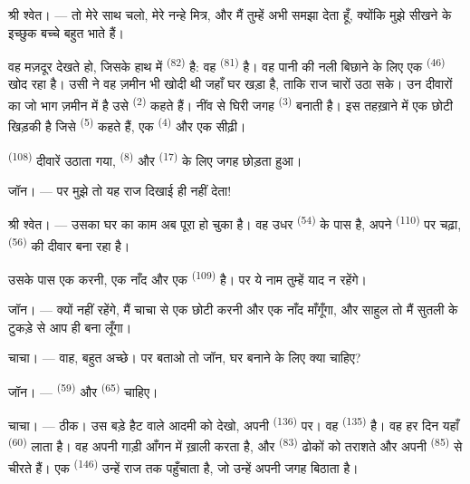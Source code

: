 \VUsaut{3.0mm}

\textsc{श्री श्वेत}। --- तो मेरे साथ चलो, मेरे नन्हे मित्र, और मैं तुम्हें अभी
समझा देता हूँ, क्योंकि मुझे सीखने के इच्छुक बच्चे बहुत भाते हैं।

वह मज़दूर देखते हो, जिसके हाथ में  \textsuperscript{(82)} है: वह
 \textsuperscript{(81)} है। वह पानी की नली बिछाने के लिए
एक  \textsuperscript{(46)} खोद रहा है। उसी ने वह ज़मीन भी खोदी थी
जहाँ घर खड़ा है, ताकि राज चारों  उठा सके। उन दीवारों का जो भाग
ज़मीन में है उसे  \textsuperscript{(2)} कहते हैं। नींव से घिरी जगह
 \textsuperscript{(3)} बनाती है। इस तहख़ाने में एक छोटी खिड़की है
जिसे  \textsuperscript{(5)} कहते हैं, एक 
\textsuperscript{(4)} और एक सीढ़ी।

 \textsuperscript{(108)} दीवारें उठाता गया, 
\textsuperscript{(8)} और  \textsuperscript{(17)} के लिए जगह
छोड़ता हुआ।

\textsc{जॉन}। --- पर मुझे तो यह राज दिखाई ही नहीं देता!

\textsc{श्री श्वेत}। --- उसका घर का काम अब पूरा हो चुका है। वह उधर
 \textsuperscript{(54)} के पास है, अपने 
\textsuperscript{(110)} पर चढ़ा,  \textsuperscript{(56)} की दीवार
बना रहा है।

उसके पास एक करनी, एक नाँद और एक  \textsuperscript{(109)} है। पर ये
नाम तुम्हें याद न रहेंगे।

\textsc{जॉन}। --- क्यों नहीं रहेंगे, मैं चाचा से एक छोटी करनी और एक नाँद
माँगूँगा, और साहुल तो मैं सुतली के टुकड़े से आप ही बना लूँगा।

\VUsaut{3.0mm}
\VUsaut{3.0mm}

\textsc{चाचा}। --- वाह, बहुत अच्छे। पर बताओ तो जॉन, घर बनाने के लिए क्या चाहिए?

\textsc{जॉन}। ---  \textsuperscript{(59)} और
 \textsuperscript{(65)} चाहिए।

\textsc{चाचा}। --- ठीक। उस बड़े हैट वाले आदमी को देखो, अपनी 
\textsuperscript{(136)} पर। वह  \textsuperscript{(135)} है। वह हर
दिन यहाँ  \textsuperscript{(60)} लाता है। वह अपनी गाड़ी
आँगन में ख़ाली करता है, और  \textsuperscript{(83)} ढोकों को
तराशते और अपनी  \textsuperscript{(85)} से चीरते हैं। एक
 \textsuperscript{(146)} उन्हें राज तक पहुँचाता है, जो उन्हें अपनी
जगह बिठाता है।

